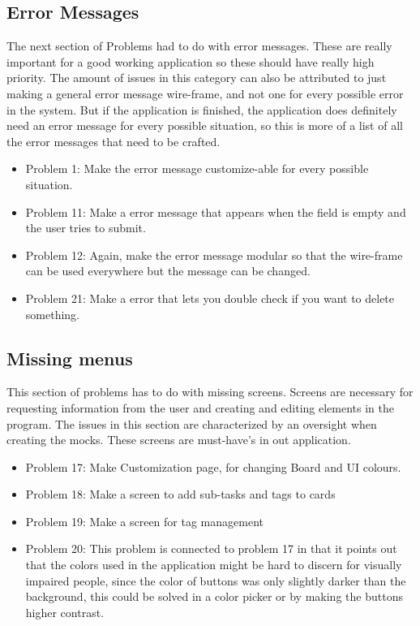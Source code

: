 \subsection{Error Messages}
The next section of Problems had to do with error messages. These are really important for a good working application so these should have really high priority. The amount of issues in this category can also be attributed to just making a general error message wire-frame, and not one for every possible error in the system. But if the application is finished, the application does definitely need an error message for every possible situation, so this is more of a list of all the error messages that need to be crafted.
\begin{itemize}
    \item Problem 1: Make the error message customize-able for every possible situation.
    \item Problem 11: Make a error message that appears when the field is empty and the user tries to submit.
    \item Problem 12: Again, make the error message modular so that the wire-frame can be used everywhere but the message can be changed.
    \item Problem 21: Make a error that lets you double check if you want to delete something.
\end{itemize}

\subsection{Missing menus}
This section of problems has to do with missing screens. Screens are necessary for requesting information from the user and creating and editing elements in the program. The issues in this section are characterized by an oversight when creating the mocks. These screens are must-have's in out application. 
\begin{itemize}
    \item Problem 17: Make Customization page, for changing Board and UI colours.
    \item Problem 18: Make a screen to add sub-tasks and tags to cards
    \item Problem 19: Make a screen for tag management
    \item Problem 20: This problem is connected to problem 17 in that it points out that the colors used in the application might be hard to discern for visually impaired people, since the color of buttons was only slightly darker than the background, this could be solved in a color picker or by making the buttons higher contrast. 
\end{itemize}

